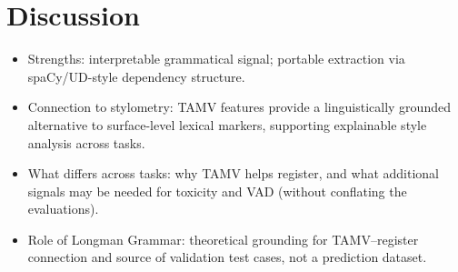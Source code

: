 \documentclass[11pt]{article}
\begin{document}
\section{Discussion}
\begin{itemize}
  \item Strengths: interpretable grammatical signal; portable extraction via spaCy/UD-style dependency structure. \citep{Nivre2010DependencyParsing,Okhapkin2021ConstructingLibraries}
  \item Connection to stylometry: TAMV features provide a linguistically grounded alternative to surface-level lexical markers, supporting explainable style analysis across tasks. \citep{Mosteller1964InferenceDisputedAuthorship,Stamatatos2009SurveyMethods}
  \item What differs across tasks: why TAMV helps register, and what additional signals may be needed for toxicity and VAD (without conflating the evaluations).
  \item Role of Longman Grammar: theoretical grounding for TAMV--register connection and source of validation test cases, not a prediction dataset. \citep{Biber20101999LongmanEnglish}
\end{itemize}
\end{document}
